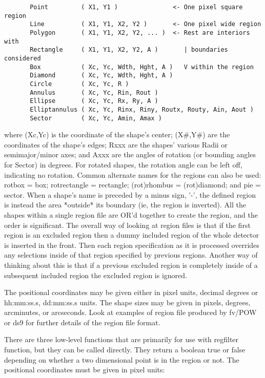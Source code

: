 \documentclass[11pt]{book}
\begin{document}
\begin{verbatim}
       Point         ( X1, Y1 )               <- One pixel square region
       Line          ( X1, Y1, X2, Y2 )       <- One pixel wide region
       Polygon       ( X1, Y1, X2, Y2, ... )  <- Rest are interiors with
       Rectangle     ( X1, Y1, X2, Y2, A )       | boundaries considered
       Box           ( Xc, Yc, Wdth, Hght, A )   V within the region
       Diamond       ( Xc, Yc, Wdth, Hght, A )
       Circle        ( Xc, Yc, R )
       Annulus       ( Xc, Yc, Rin, Rout )
       Ellipse       ( Xc, Yc, Rx, Ry, A )
       Elliptannulus ( Xc, Yc, Rinx, Riny, Routx, Routy, Ain, Aout )
       Sector        ( Xc, Yc, Amin, Amax )
\end{verbatim}
    where (Xc,Yc) is  the coordinate of  the shape's center; (X\#,Y\#) are
    the coordinates  of the shape's edges;  Rxxx are the shapes' various
    Radii or semimajor/minor  axes; and Axxx  are the angles of rotation
    (or bounding angles for Sector) in degrees.  For rotated shapes, the
    rotation angle  can  be left  off, indicating  no rotation.   Common
    alternate  names for the regions  can also be  used: rotbox = box;
    rotrectangle = rectangle;  (rot)rhombus = (rot)diamond;  and pie
    = sector.  When a  shape's name is  preceded by a minus sign, '-',
    the defined region  is instead the area  *outside* its boundary (ie,
    the region is inverted).  All the shapes within a single region
    file are OR'd together to create the region, and the order is
    significant. The overall way of looking at region files is that if
    the first region is an excluded region then a dummy included region
    of the whole detector is inserted in the front. Then each region
    specification as it is processed overrides any selections inside of
    that region specified by previous regions. Another way of thinking
    about this is that if a previous excluded region is completely
    inside of a subsequent included region the excluded region is
    ignored.

    The positional coordinates may be given either in pixel units,
    decimal degrees or hh:mm:ss.s, dd:mm:ss.s units.  The shape sizes
    may be given in pixels, degrees, arcminutes, or arcseconds.  Look
    at examples of region file produced by fv/POW or ds9 for further
    details of the region file format.

    There are three low-level  functions that are primarily for use with
    regfilter function, but they  can  be  called  directly.  They
    return  a  boolean true   or  false  depending   on  whether a   two
    dimensional point is in the region or not.  The positional coordinates
    must be given in pixel units:
\end{document}
